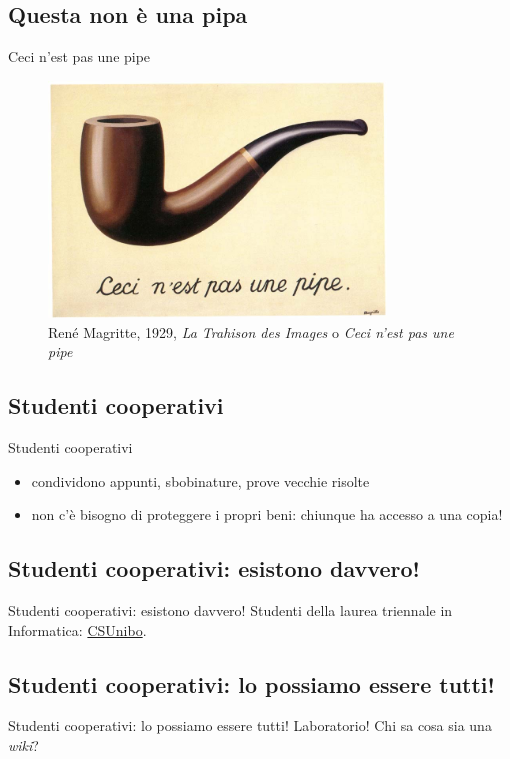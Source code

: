 \documentclass{beamer}
\begin{document}
\subsection{Questa non è una pipa}
\begin{frame}{Ceci n'est pas une pipe}
  \begin{figure}
    \includegraphics[width=0.8\textwidth]{assets/magritte-pipe.jpg}
    \caption{René Magritte, 1929, \emph{La Trahison des Images} o \emph{Ceci n'est
      pas une pipe}}
  \end{figure}
\end{frame}

\subsection{Studenti cooperativi}
\begin{frame}{Studenti cooperativi}
  \begin{itemize}
    \item<1-> condividono appunti, sbobinature, prove vecchie risolte
    \item<2-> non c'è bisogno di proteggere i propri beni: chiunque ha accesso a
      una copia!
  \end{itemize}
\end{frame}

\subsection{Studenti cooperativi: esistono davvero!}
\begin{frame}{Studenti cooperativi: esistono davvero!}
  Studenti della laurea triennale in Informatica:
  \href{https://csunibo.github.io/}{CSUnibo}.
\end{frame}

\subsection{Studenti cooperativi: lo possiamo essere tutti!}
\begin{frame}{Studenti cooperativi: lo possiamo essere tutti!}
  Laboratorio! Chi sa cosa sia una \emph{wiki}?
\end{frame}
\end{document}

